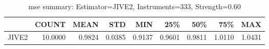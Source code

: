 \begin{table}[ht]
\centering
\caption{mse summary: Estimator=JIVE2, Instruments=333, Strength=0.60}
\begin{tabular}{lrrrrrrrr}
\toprule
 & COUNT & MEAN & STD & MIN & 25\% & 50\% & 75\% & MAX \\
\midrule
JIVE2 & 10.0000 & 0.9824 & 0.0385 & 0.9137 & 0.9601 & 0.9811 & 1.0110 & 1.0431 \\
\bottomrule
\end{tabular}
\end{table}
